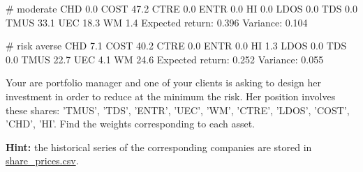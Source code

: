 \begin{solution}
\begin{ioutput}
# moderate
CHD 0.0 COST 47.2 CTRE 0.0 ENTR 0.0 HI 0.0 LDOS 0.0 TDS 0.0 TMUS 33.1 UEC 18.3 WM 1.4 
Expected return: 0.396
Variance: 0.104

# risk averse
CHD 7.1 COST 40.2 CTRE 0.0 ENTR 0.0 HI 1.3 LDOS 0.0 TDS 0.0 TMUS 22.7 UEC 4.1 WM 24.6 
Expected return: 0.252
Variance: 0.055
\end{ioutput}
\end{solution}

\begin{question}
Your are portfolio manager and one of your clients is asking to design her investment in order to reduce at the minimum the risk. Her position involves these shares: 'TMUS', 'TDS', 'ENTR', 'UEC', 'WM', 'CTRE', 'LDOS', 'COST', 'CHD', 'HI'.
Find the weights corresponding to each asset.

\noindent\textbf{Hint:} the historical series of the corresponding companies are stored in \href{https://github.com/matteosan1/finance_course/raw/master/input_files/share_price.csv}{share\_prices.csv}.

\end{question}

